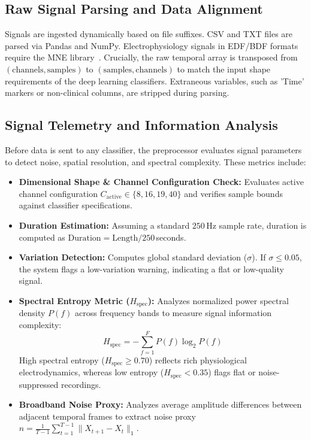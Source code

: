 \documentclass[runningheads]{llncs}
\begin{document}
\subsection{Raw Signal Parsing and Data Alignment}
Signals are ingested dynamically based on file suffixes. CSV and TXT files are parsed via Pandas and NumPy. Electrophysiology signals in EDF/BDF formats require the MNE library~\cite{mne}. Crucially, the raw temporal array is transposed from $(\text{channels}, \text{samples})$ to $(\text{samples}, \text{channels})$ to match the input shape requirements of the deep learning classifiers. Extraneous variables, such as 'Time' markers or non-clinical columns, are stripped during parsing.

\subsection{Signal Telemetry and Information Analysis}
Before data is sent to any classifier, the preprocessor evaluates signal parameters to detect noise, spatial resolution, and spectral complexity. These metrics include:
\begin{itemize}
    \item \textbf{Dimensional Shape \& Channel Configuration Check:} Evaluates active channel configuration $C_{\text{active}} \in \{8, 16, 19, 40\}$ and verifies sample bounds against classifier specifications.
    \item \textbf{Duration Estimation:} Assuming a standard $250$\,Hz sample rate, duration is computed as $\text{Duration} = \text{Length} / 250$\,seconds.
    \item \textbf{Variation Detection:} Computes global standard deviation ($\sigma$). If $\sigma \le 0.05$, the system flags a low-variation warning, indicating a flat or low-quality signal.
    \item \textbf{Spectral Entropy Metric ($H_{\text{spec}}$):} Analyzes normalized power spectral density $P(f)$ across frequency bands to measure signal information complexity:
    \begin{equation}
    H_{\text{spec}} = -\sum_{f=1}^{F} P(f) \log_2 P(f)
    \end{equation}
    High spectral entropy ($H_{\text{spec}} \ge 0.70$) reflects rich physiological electrodynamics, whereas low entropy ($H_{\text{spec}} < 0.35$) flags flat or noise-suppressed recordings.
    \item \textbf{Broadband Noise Proxy:} Analyzes average amplitude differences between adjacent temporal frames to extract noise proxy $\hat{n} = \frac{1}{T-1}\sum_{t=1}^{T-1}\|X_{t+1}-X_t\|_1$.
\end{itemize}
\end{document}
